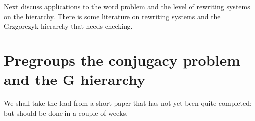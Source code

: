 \documentclass[12pt,a4paper,draft]{article}
\begin{document}
Next discuss applications to the word problem and the level of rewriting
systems on the hierarchy. There is some literature on rewriting systems
and the Grzgorczyk hierarchy that needs checking. 
\section{Pregroups the conjugacy problem and the G hierarchy}
We shall take the lead from a short paper that has not yet been quite completed: but should be done in a couple of weeks. 


\end{document}
